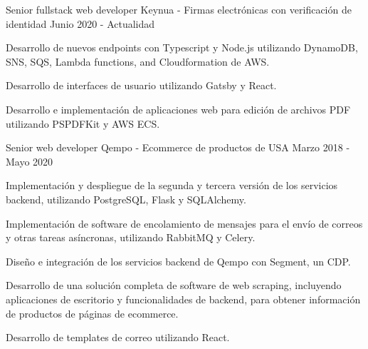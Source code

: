 

\begin{cventries}

  \cventry
    {Senior fullstack web developer}
    {Keynua {\normalfont - Firmas electrónicas con verificación de identidad}}
    {} %
    {Junio 2020 - Actualidad} %
    {
      \begin{cvitems} %
        \item {Desarrollo de nuevos endpoints con Typescript y Node.js utilizando DynamoDB, SNS, SQS, Lambda functions, and Cloudformation de AWS.}
        \item {Desarrollo de interfaces de usuario utilizando Gatsby y React.}
        \item {Desarrollo e implementación de aplicaciones web para edición de archivos PDF utilizando PSPDFKit y AWS ECS.}
      \end{cvitems}
    }

  \cventry
    {Senior web developer} %
    {Qempo {\normalfont - Ecommerce de productos de USA}} %
    {} %
    {Marzo 2018 - Mayo 2020} %
    {
      \begin{cvitems} %
        \item {Implementación y despliegue de la segunda y tercera versión de los servicios backend, utilizando PostgreSQL, Flask y SQLAlchemy.}
        \item {Implementación de software de encolamiento de mensajes para el envío de correos y otras tareas asíncronas, utilizando RabbitMQ y Celery.}
        \item {Diseño e integración de los servicios backend de Qempo con Segment, un CDP.}
        \item {Desarrollo de una solución completa de software de web scraping, incluyendo aplicaciones de escritorio y funcionalidades de backend, para obtener información de productos de páginas de ecommerce.}
        \item {Desarrollo de templates de correo utilizando React.}
      \end{cvitems}
    }


\end{cventries}
